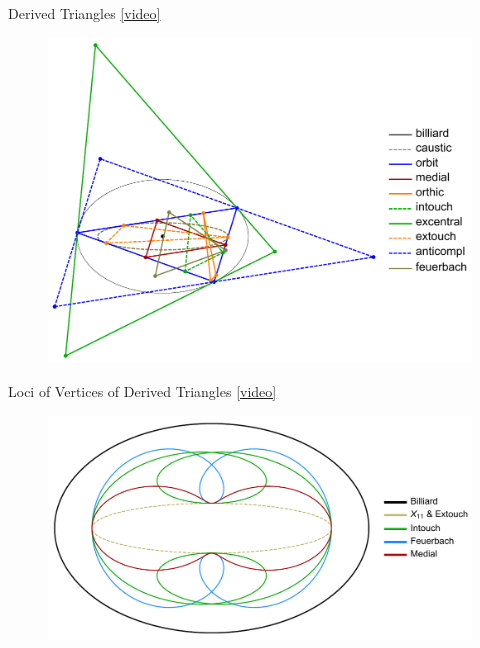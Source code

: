 \begin{frame}{Derived Triangles \href{https://youtu.be/xyroRTEVNDc}{[video]}}
\begin{figure}
\includegraphics[clip,trim={0 0 0 3cm},height=.8\textheight]{pics/0043_derived-triangles.pdf}
\end{figure}
\end{frame}

\begin{frame}{Loci of Vertices of Derived Triangles \href{https://youtu.be/OGvCQbYqJyI}{[video]}}
\begin{figure}
\includegraphics[height=.7\textheight]{pics/0040_non_elliptic.pdf}
\end{figure}
\end{frame}

